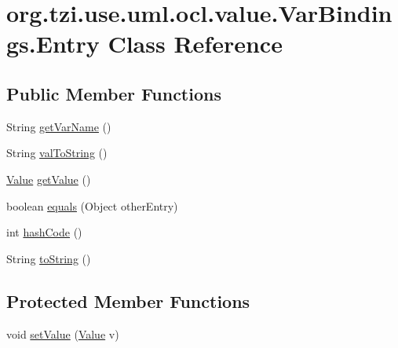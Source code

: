 \hypertarget{classorg_1_1tzi_1_1use_1_1uml_1_1ocl_1_1value_1_1_var_bindings_1_1_entry}{\section{org.\-tzi.\-use.\-uml.\-ocl.\-value.\-Var\-Bindings.\-Entry Class Reference}
\label{classorg_1_1tzi_1_1use_1_1uml_1_1ocl_1_1value_1_1_var_bindings_1_1_entry}
}
\subsection*{Public Member Functions}
\begin{DoxyCompactItemize}
\item 
String \hyperlink{classorg_1_1tzi_1_1use_1_1uml_1_1ocl_1_1value_1_1_var_bindings_1_1_entry_a63f2b1040c2b38e516d57fe2a32d8d35}{get\-Var\-Name} ()
\item 
String \hyperlink{classorg_1_1tzi_1_1use_1_1uml_1_1ocl_1_1value_1_1_var_bindings_1_1_entry_afb85d20212326e91fc9d55515b5153fb}{val\-To\-String} ()
\item 
\hyperlink{classorg_1_1tzi_1_1use_1_1uml_1_1ocl_1_1value_1_1_value}{Value} \hyperlink{classorg_1_1tzi_1_1use_1_1uml_1_1ocl_1_1value_1_1_var_bindings_1_1_entry_a3405f36fa1d2405a065ea2c247983f90}{get\-Value} ()
\item 
boolean \hyperlink{classorg_1_1tzi_1_1use_1_1uml_1_1ocl_1_1value_1_1_var_bindings_1_1_entry_a9b94322520152a04032d02ab4fa7f97a}{equals} (Object other\-Entry)
\item 
int \hyperlink{classorg_1_1tzi_1_1use_1_1uml_1_1ocl_1_1value_1_1_var_bindings_1_1_entry_a1dfaa3258b0bb6b9d12f22c532e9d2c3}{hash\-Code} ()
\item 
String \hyperlink{classorg_1_1tzi_1_1use_1_1uml_1_1ocl_1_1value_1_1_var_bindings_1_1_entry_acbee5d2ea843e15d5d4f038ab70c8f23}{to\-String} ()
\end{DoxyCompactItemize}
\subsection*{Protected Member Functions}
\begin{DoxyCompactItemize}
\item 
void \hyperlink{classorg_1_1tzi_1_1use_1_1uml_1_1ocl_1_1value_1_1_var_bindings_1_1_entry_a3253962ac963210c8496e06a63363eb3}{set\-Value} (\hyperlink{classorg_1_1tzi_1_1use_1_1uml_1_1ocl_1_1value_1_1_value}{Value} v)
\end{DoxyCompactItemize}


